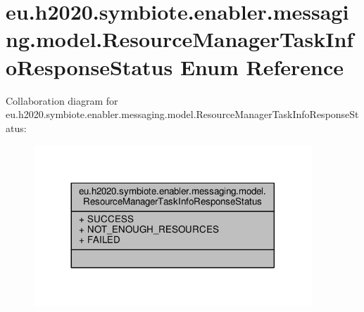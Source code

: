 \hypertarget{enumeu_1_1h2020_1_1symbiote_1_1enabler_1_1messaging_1_1model_1_1ResourceManagerTaskInfoResponseStatus}{}\section{eu.\+h2020.\+symbiote.\+enabler.\+messaging.\+model.\+Resource\+Manager\+Task\+Info\+Response\+Status Enum Reference}
\label{enumeu_1_1h2020_1_1symbiote_1_1enabler_1_1messaging_1_1model_1_1ResourceManagerTaskInfoResponseStatus}


Collaboration diagram for eu.\+h2020.\+symbiote.\+enabler.\+messaging.\+model.\+Resource\+Manager\+Task\+Info\+Response\+Status\+:\nopagebreak
\begin{figure}[H]
\begin{center}
\leavevmode
\includegraphics[width=296pt]{enumeu_1_1h2020_1_1symbiote_1_1enabler_1_1messaging_1_1model_1_1ResourceManagerTaskInfoResponseStatus__coll__graph}
\end{center}
\end{figure}
